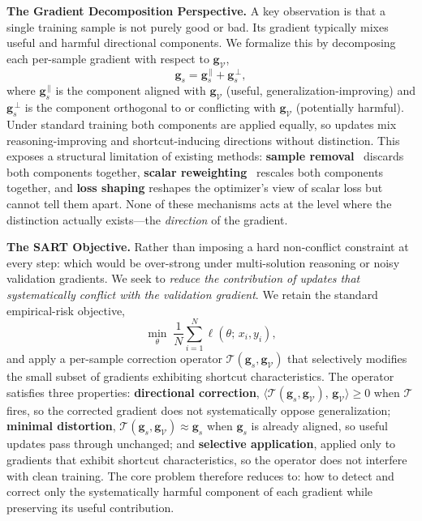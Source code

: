 \textbf{The Gradient Decomposition Perspective.}
A key observation is that a single training sample is not purely good or bad. Its gradient typically mixes useful and harmful directional components. We formalize this by decomposing each per-sample gradient with respect to $\mathbf{g}_{\mathcal{V}}$,
\begin{equation}
    \mathbf{g}_s = \mathbf{g}_s^{\,\parallel} + \mathbf{g}_s^{\,\perp},
\end{equation}
where $\mathbf{g}_s^{\,\parallel}$ is the component aligned with $\mathbf{g}_{\mathcal{V}}$ (useful, generalization-improving) and $\mathbf{g}_s^{\,\perp}$ is the component orthogonal to or conflicting with $\mathbf{g}_{\mathcal{V}}$ (potentially harmful). Under standard training both components are applied equally, so updates mix reasoning-improving and shortcut-inducing directions without distinction. This exposes a structural limitation of existing methods: \textbf{sample removal}~\cite{koh2020understandingblackboxpredictionsinfluence,bengio2009curriculum} discards both components together, \textbf{scalar reweighting}~\cite{lin2018focallossdenseobject,liu2021justtraintwiceimproving} rescales both components together, and \textbf{loss shaping} reshapes the optimizer's view of scalar loss but cannot tell them apart. None of these mechanisms acts at the level where the distinction actually exists---the \emph{direction} of the gradient.

\textbf{The SART Objective.}
Rather than imposing a hard non-conflict constraint at every step: which would be over-strong under multi-solution reasoning or noisy validation gradients. We seek to \emph{reduce the contribution of updates that systematically conflict with the validation gradient}. We retain the standard empirical-risk objective,
\begin{equation}
    \min_{\theta} \; \frac{1}{N} \sum_{i=1}^{N} \ell(\theta;\, x_i, y_i),
\end{equation}
and apply a per-sample correction operator $\mathcal{T}(\mathbf{g}_s, \mathbf{g}_{\mathcal{V}})$ that selectively modifies the small subset of gradients exhibiting shortcut characteristics. The operator satisfies three properties: \textbf{directional correction}, $\langle \mathcal{T}(\mathbf{g}_s, \mathbf{g}_{\mathcal{V}}),\, \mathbf{g}_{\mathcal{V}} \rangle \geq 0$ when $\mathcal{T}$ fires, so the corrected gradient does not systematically oppose generalization; \textbf{minimal distortion}, $\mathcal{T}(\mathbf{g}_s, \mathbf{g}_{\mathcal{V}}) \approx \mathbf{g}_s$ when $\mathbf{g}_s$ is already aligned, so useful updates pass through unchanged; and \textbf{selective application}, applied only to gradients that exhibit shortcut characteristics, so the operator does not interfere with clean training. The core problem therefore reduces to: how to detect and correct only the systematically harmful component of each gradient while preserving its useful contribution.

